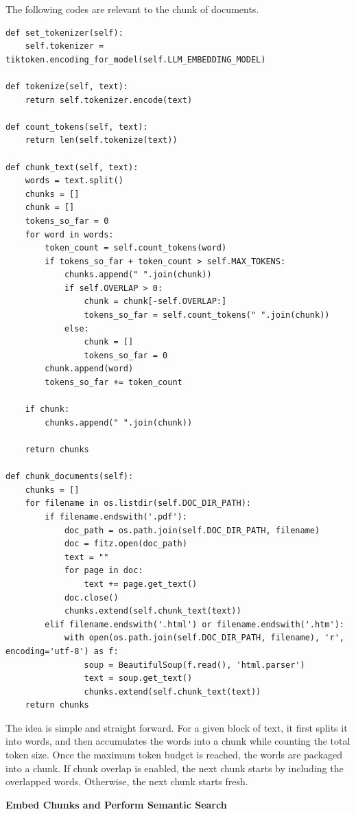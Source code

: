 The following codes are relevant to the chunk of documents.

\begin{lstlisting}
def set_tokenizer(self):
    self.tokenizer = tiktoken.encoding_for_model(self.LLM_EMBEDDING_MODEL)

def tokenize(self, text):
    return self.tokenizer.encode(text)

def count_tokens(self, text):
    return len(self.tokenize(text))

def chunk_text(self, text):
    words = text.split()
    chunks = []
    chunk = []
    tokens_so_far = 0
    for word in words:
        token_count = self.count_tokens(word)
        if tokens_so_far + token_count > self.MAX_TOKENS:
            chunks.append(" ".join(chunk))
            if self.OVERLAP > 0:
                chunk = chunk[-self.OVERLAP:]
                tokens_so_far = self.count_tokens(" ".join(chunk))
            else:
                chunk = []
                tokens_so_far = 0
        chunk.append(word)
        tokens_so_far += token_count

    if chunk:
        chunks.append(" ".join(chunk))

    return chunks

def chunk_documents(self):
    chunks = []
    for filename in os.listdir(self.DOC_DIR_PATH):
        if filename.endswith('.pdf'):
            doc_path = os.path.join(self.DOC_DIR_PATH, filename)
            doc = fitz.open(doc_path)
            text = ""
            for page in doc:
                text += page.get_text()
            doc.close()
            chunks.extend(self.chunk_text(text))
        elif filename.endswith('.html') or filename.endswith('.htm'):
            with open(os.path.join(self.DOC_DIR_PATH, filename), 'r', encoding='utf-8') as f:
                soup = BeautifulSoup(f.read(), 'html.parser')
                text = soup.get_text()
                chunks.extend(self.chunk_text(text))
    return chunks
\end{lstlisting}

The idea is simple and straight forward. For a given block of text, it first splits it into words, and then accumulates the words into a chunk while counting the total token size. Once the maximum token budget is reached, the words are packaged into a chunk. If chunk overlap is enabled, the next chunk starts by including the overlapped words. Otherwise, the next chunk starts fresh.

\vspace{0.1in}
\noindent \textbf{Embed Chunks and Perform Semantic Search}
\vspace{0.1in}

